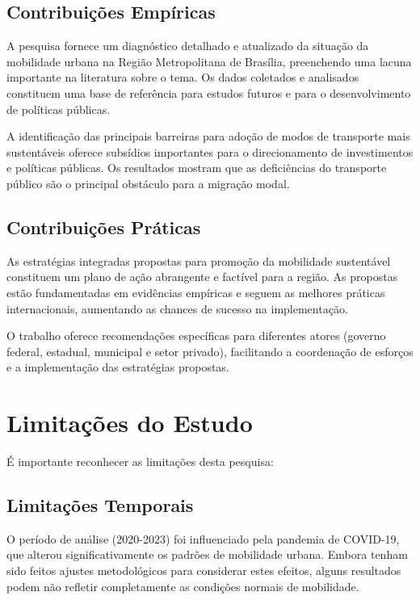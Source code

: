 \subsection{Contribuições Empíricas}

A pesquisa fornece um diagnóstico detalhado e atualizado da situação da mobilidade urbana na Região Metropolitana de Brasília, preenchendo uma lacuna importante na literatura sobre o tema. Os dados coletados e analisados constituem uma base de referência para estudos futuros e para o desenvolvimento de políticas públicas.

A identificação das principais barreiras para adoção de modos de transporte mais sustentáveis oferece subsídios importantes para o direcionamento de investimentos e políticas públicas. Os resultados mostram que as deficiências do transporte público são o principal obstáculo para a migração modal.

\subsection{Contribuições Práticas}

As estratégias integradas propostas para promoção da mobilidade sustentável constituem um plano de ação abrangente e factível para a região. As propostas estão fundamentadas em evidências empíricas e seguem as melhores práticas internacionais, aumentando as chances de sucesso na implementação.

O trabalho oferece recomendações específicas para diferentes atores (governo federal, estadual, municipal e setor privado), facilitando a coordenação de esforços e a implementação das estratégias propostas.

\section{Limitações do Estudo}

É importante reconhecer as limitações desta pesquisa:

\subsection{Limitações Temporais}

O período de análise (2020-2023) foi influenciado pela pandemia de COVID-19, que alterou significativamente os padrões de mobilidade urbana. Embora tenham sido feitos ajustes metodológicos para considerar estes efeitos, alguns resultados podem não refletir completamente as condições normais de mobilidade.

